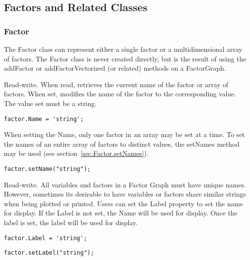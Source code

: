 \subsection{Factors and Related Classes}

\subsubsection{Factor}

The Factor class can represent either a single factor or a multidimensional array of factors.  The Factor class is never created directly, but is the result of using the addFactor or addFactorVectorized (or related) methods on a FactorGraph.



Read-write.  When read, retrieves the current name of the factor or array of factors.  When set, modifies the name of the factor to the corresponding value.  The value set must be a string.

\ifmatlab
\begin{lstlisting}
factor.Name = 'string';
\end{lstlisting}

When setting the Name, only one factor in an array may be set at a time.  To set the names of an entire array of factors to distinct values, the setNames method may be used (see section~\ref{sec:Factor.setNames}).

\fi

\ifjava
\begin{lstlisting}
factor.setName("string");
\end{lstlisting}
\fi



Read-write. All variables and factors in a Factor Graph must have unique names. However, sometimes its desirable to have variables or factors share similar strings when being plotted or printed. Users can set the Label property to set the name for display. If the Label is not set, the Name will be used for display. Once the label is set, the label will be used for display.

\ifmatlab
\begin{lstlisting}
factor.Label = 'string';
\end{lstlisting}
\fi

\ifmatlab
\begin{lstlisting}
factor.setLabel("string");
\end{lstlisting}
\fi


